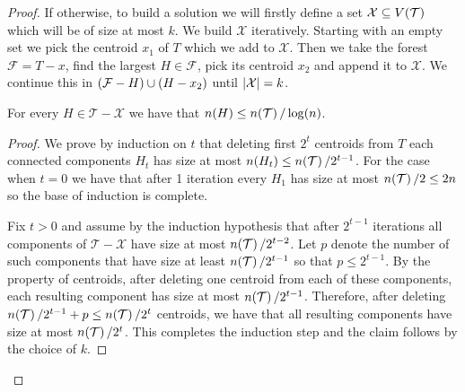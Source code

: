 \begin{theorem}
\begin{proof}
If otherwise, to build a solution we will firstly define a set $\mathcal{X}\subseteq V\mathopen{}\left( \mathcal{T} \right)$ which will be of size at most $k$. We build $\mathcal{X}$ iteratively. Starting with an empty set we pick the centroid $x_1$ of $T$ which we add to $\mathcal{X}$. Then we take the forest $\mathcal{F}=T-x$, find the largest $H\in \mathcal{F}$, pick its centroid $x_2$ and append it to $\mathcal{X}$. We continue this in $\mathopen{}\left( \mathcal{F}-H \right) \cup \mathopen{}\left( H-x_2 \right)$ until $\mathopen{}\left| \mathcal{X} \right|=k$.
\begin{lemma}\label{lemma:componentSize}
    For every $H\in \mathcal{T}-\mathcal{X}$ we have that $n\mathopen{}\left( H \right)\leq n\mathopen{}\left( \mathcal{T} \right)/\log\mathopen{}\left( n \right)$.
    \begin{proof}
        We prove by induction on $t$ that deleting first $2^t$ centroids from $T$ each connected components $H_t$ has size at most $n\mathopen{}\left( H_t \right)\leq n\mathopen{}\left( \mathcal{T} \right)/2^{t-1}$. For the case when $t=0$ we have that after 1 iteration every $H_1$ has size at most $n\mathopen{}\left( \mathcal{T} \right)/2\leq 2n$ so the base of induction is complete.

        Fix $t>0$ and assume by the induction hypothesis that after $2^{t-1}$ iterations all components of $\mathcal{T}-\mathcal{X}$ have size at most $n\mathopen{}\left( \mathcal{T} \right)/2^{t-2}$. Let $p$ denote the number of such components that have size at least $n\mathopen{}\left( \mathcal{T} \right)/2^{t-1}$ so that $p\leq 2^{t-1}$. By the property of centroids, after deleting one centroid from each of these components, each resulting component has size at most $n\mathopen{}\left( \mathcal{T} \right)/2^{t-1}$. Therefore, after deleting $n\mathopen{}\left( \mathcal{T} \right)/2^{t-1}+p\leq n\mathopen{}\left( \mathcal{T} \right)/2^{t}$ centroids, we have that all resulting components have size at most $n\mathopen{}\left( \mathcal{T} \right)/2^t$. This completes the induction step and the claim follows by the choice of $k$.
    \end{proof}
\end{lemma}


\end{proof}
\end{theorem}
